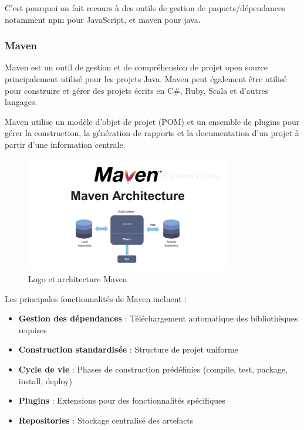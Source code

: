 \documentclass[12pt,a4paper]{report}
\begin{document}
C'est pourquoi on fait recours à des outils de gestion de paquets/dépendances notamment npm pour JavaScript, et maven pour java.

\subsubsection{Maven}

Maven est un outil de gestion et de compréhension de projet open source principalement utilisé pour les projets Java. Maven peut également être utilisé pour construire et gérer des projets écrits en C\#, Ruby, Scala et d'autres langages.

Maven utilise un modèle d'objet de projet (POM) et un ensemble de plugins pour gérer la construction, la génération de rapports et la documentation d'un projet à partir d'une information centrale.

\begin{figure}[htbp]
    \centering
    \includegraphics[width=0.8\textwidth]{latex_media/media/maven.png}
    \caption{Logo et architecture Maven}
    \label{fig:maven-logo}
\end{figure}

Les principales fonctionnalités de Maven incluent :

\begin{itemize}
    \item \textbf{Gestion des dépendances} : Téléchargement automatique des bibliothèques requises
    \item \textbf{Construction standardisée} : Structure de projet uniforme
    \item \textbf{Cycle de vie} : Phases de construction prédéfinies (compile, test, package, install, deploy)
    \item \textbf{Plugins} : Extensions pour des fonctionnalités spécifiques
    \item \textbf{Repositories} : Stockage centralisé des artefacts
\end{itemize}
\end{document}
